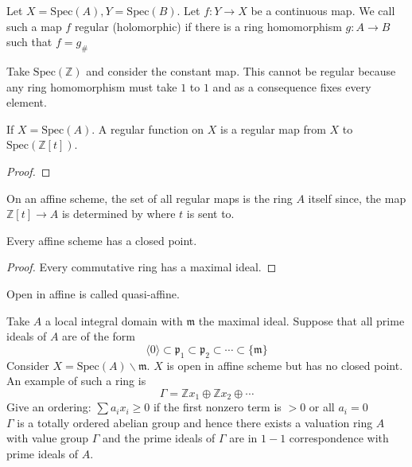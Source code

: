 \documentclass[oneside, 12pt, ]{scrbook}
\newcommand{\ZZ}{\mathbb Z}
\newcommand{\spec}{\mathrm{Spec}}
\newcommand{\pr}{\mathfrak{p}}
\newcommand{\m}{\mathfrak{m}}
\theoremstyle{theorem}
\begin{document}
\begin{definition}
Let $X= \spec(A), Y = \spec(B)$. Let $f: Y \rightarrow X$ be a continuous map. We call such a map $f$ regular (holomorphic) if there is a ring homomorphism $g: A \rightarrow B$ such that $f = g_{\#}$
\end{definition}

\begin{example}
Take $\spec(\ZZ)$ and consider the constant map. This cannot be regular because any ring homomorphism must take $1$ to $1$ and as a consequence fixes every element. 
\end{example}

\begin{proposition}
If $X = \spec(A)$. A regular function on $X$ is a regular map from $X$ to $\spec(\ZZ[t])$.
\end{proposition}

\begin{proof}

\end{proof}

\begin{remark}
On an affine scheme, the set of all regular maps is the ring $A$ itself since, the map $\ZZ[t] \rightarrow A$ is determined by where $t$ is sent to. 
\end{remark}

\begin{lemma}
Every affine scheme has a closed point.
\end{lemma}

\begin{proof}
Every commutative ring has a maximal ideal. 
\end{proof}

\begin{definition}
Open in affine is called quasi-affine.
\end{definition}

\begin{example}
Take $A$ a local integral domain with $\m$ the maximal ideal. Suppose that all prime ideals of $A$ are of the form $$\langle 0 \rangle \subset \pr_{1} \subset \pr_{2} \subset \cdots \subset \{ \m \}$$ Consider $X = \spec(A) \backslash \m$. $X$ is open in affine scheme but has no closed point. \\

An example of such a ring is $$\Gamma = \ZZ x_{1} \oplus \ZZ x_{2} \oplus \cdots $$ Give an ordering: $\sum a_{i}x_{i} \geq 0$ if the first nonzero term is $>0$ or all $a_{i}=0$\\
$\Gamma$ is a totally ordered abelian group and hence there exists a valuation ring $A$ with value group $\Gamma$ and the prime ideals of $\Gamma$ are in $1-1$ correspondence with prime ideals of $A$.
\end{example}
\end{document}

